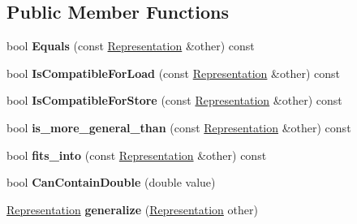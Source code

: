 \subsection*{Public Member Functions}
\begin{DoxyCompactItemize}
\item 
\hypertarget{classv8_1_1internal_1_1_representation_aef2824eae6d4f0014fcea672f6581188}{}bool {\bfseries Equals} (const \hyperlink{classv8_1_1internal_1_1_representation}{Representation} \&other) const \label{classv8_1_1internal_1_1_representation_aef2824eae6d4f0014fcea672f6581188}

\item 
\hypertarget{classv8_1_1internal_1_1_representation_a9a05513eaa5f42617b86e81ddbcf9c15}{}bool {\bfseries Is\+Compatible\+For\+Load} (const \hyperlink{classv8_1_1internal_1_1_representation}{Representation} \&other) const \label{classv8_1_1internal_1_1_representation_a9a05513eaa5f42617b86e81ddbcf9c15}

\item 
\hypertarget{classv8_1_1internal_1_1_representation_ad0e4af1f0c3ed377393e8384328edae1}{}bool {\bfseries Is\+Compatible\+For\+Store} (const \hyperlink{classv8_1_1internal_1_1_representation}{Representation} \&other) const \label{classv8_1_1internal_1_1_representation_ad0e4af1f0c3ed377393e8384328edae1}

\item 
\hypertarget{classv8_1_1internal_1_1_representation_a536e4cf9ec1fa78a9dfabc3d75661a2c}{}bool {\bfseries is\+\_\+more\+\_\+general\+\_\+than} (const \hyperlink{classv8_1_1internal_1_1_representation}{Representation} \&other) const \label{classv8_1_1internal_1_1_representation_a536e4cf9ec1fa78a9dfabc3d75661a2c}

\item 
\hypertarget{classv8_1_1internal_1_1_representation_a6040d81dd1341196a8ed306893a34249}{}bool {\bfseries fits\+\_\+into} (const \hyperlink{classv8_1_1internal_1_1_representation}{Representation} \&other) const \label{classv8_1_1internal_1_1_representation_a6040d81dd1341196a8ed306893a34249}

\item 
\hypertarget{classv8_1_1internal_1_1_representation_a1e36aacb0da5a5423d9162d7a2f0192a}{}bool {\bfseries Can\+Contain\+Double} (double value)\label{classv8_1_1internal_1_1_representation_a1e36aacb0da5a5423d9162d7a2f0192a}

\item 
\hypertarget{classv8_1_1internal_1_1_representation_a8bdd97567badb1040967d90910c76c54}{}\hyperlink{classv8_1_1internal_1_1_representation}{Representation} {\bfseries generalize} (\hyperlink{classv8_1_1internal_1_1_representation}{Representation} other)\label{classv8_1_1internal_1_1_representation_a8bdd97567badb1040967d90910c76c54}


\end{DoxyCompactItemize}
